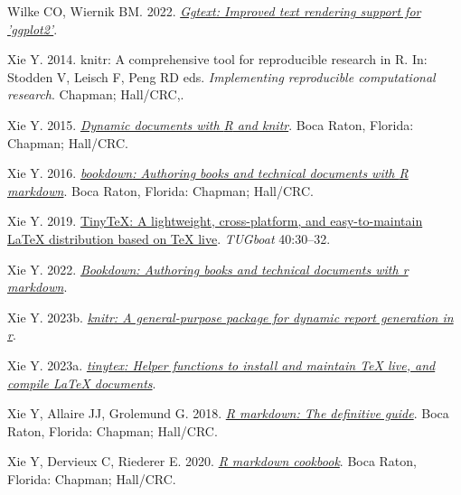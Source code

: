 \documentclass[10pt,a4paper]{article}
\newlength{\cslhangindent}
\newenvironment{CSLReferences}[2] %
 {\begin{list}{}{%
  \setlength{\itemindent}{0pt}
  \setlength{\leftmargin}{0pt}
  \setlength{\parsep}{0pt}
  \ifodd #1
   \setlength{\leftmargin}{\cslhangindent}
   \setlength{\itemindent}{-1\cslhangindent}
  \fi
  \setlength{\itemsep}{#2\baselineskip}}}
 {\end{list}}
\begin{document}
\begin{CSLReferences}{1}{0}
Wilke CO, Wiernik BM. 2022. \emph{\href{https://CRAN.R-project.org/package=ggtext}{Ggtext: Improved text rendering support for 'ggplot2'}}.

Xie Y. 2014. {knitr}: A comprehensive tool for reproducible research in {R}. In: Stodden V, Leisch F, Peng RD eds. \emph{Implementing reproducible computational research}. Chapman; Hall/CRC,.

Xie Y. 2015. \emph{\href{https://yihui.org/knitr/}{Dynamic documents with {R} and knitr}}. Boca Raton, Florida: Chapman; Hall/CRC.

Xie Y. 2016. \emph{\href{https://bookdown.org/yihui/bookdown}{{bookdown}: Authoring books and technical documents with {R} markdown}}. Boca Raton, Florida: Chapman; Hall/CRC.

Xie Y. 2019. \href{https://tug.org/TUGboat/Contents/contents40-1.html}{{TinyTeX}: A lightweight, cross-platform, and easy-to-maintain LaTeX distribution based on TeX live}. \emph{TUGboat} 40:30--32.

Xie Y. 2022. \emph{\href{https://CRAN.R-project.org/package=bookdown}{Bookdown: Authoring books and technical documents with r markdown}}.

Xie Y. 2023b. \emph{\href{https://yihui.org/knitr/}{{knitr}: A general-purpose package for dynamic report generation in r}}.

Xie Y. 2023a. \emph{\href{https://github.com/rstudio/tinytex}{{tinytex}: Helper functions to install and maintain TeX live, and compile LaTeX documents}}.

Xie Y, Allaire JJ, Grolemund G. 2018. \emph{\href{https://bookdown.org/yihui/rmarkdown}{R markdown: The definitive guide}}. Boca Raton, Florida: Chapman; Hall/CRC.

Xie Y, Dervieux C, Riederer E. 2020. \emph{\href{https://bookdown.org/yihui/rmarkdown-cookbook}{R markdown cookbook}}. Boca Raton, Florida: Chapman; Hall/CRC.

\end{CSLReferences}
\end{document}
